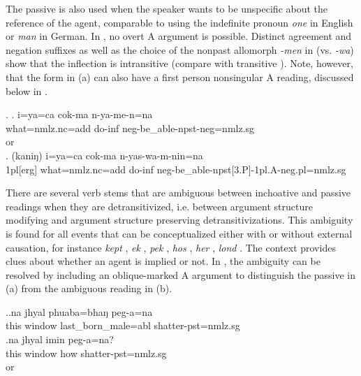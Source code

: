 The passive is also used when the speaker wants to be unspecific about the reference of the agent, comparable to using the indefinite pronoun \emph{one} in English or \emph{man} in German. In  \Next[a], no overt A argument is possible. Distinct agreement and negation suffixes as well as the choice of the nonpast allomorph \emph{-men} in \Next[a] (vs.  \emph{-wa}) show that the inflection is intransitive (compare with transitive \Next[b]). Note, however, that the form in (a) can also have a first person nonsingular A reading, discussed below in .

\ex. \ag. i=ya=ca cok-ma n-ya-me-n=na\\
what{\sc =nmlz.nc=add} do{\sc -inf} {\sc neg-}be\_able{\sc [3sg]-npst-neg=nmlz.sg}\\
 or\\
\bg. (kaniŋ) i=ya=ca cok-ma n-yas-wa-m-nin=na \\
{\sc 1pl[erg]} what{\sc =nmlz.nc=add} do{\sc -inf} {\sc neg-}be\_able{\sc -npst[3.P]-1pl.A-neg.pl=nmlz.sg}\\ 


There are several verb stems that are ambiguous between inchoative and passive readings when they are detransitivized, i.e. between argument structure modifying and argument structure preserving detransitivizations. This ambiguity is found for all events that can be conceptualized either with or without external causation, for instance \emph{kept} , \emph{ek} ,  \emph{pek} , \emph{hos} , \emph{her} , \emph{lond} . The context provides clues about whether an agent is implied or not. In \Next, the ambiguity can be resolved by including an oblique-marked A argument to distinguish the passive in (a) from the ambiguous reading in (b). 

\ex.\ag.na jhyal phuaba=bhaŋ peg-a=na\\
this window  last\_born\_male{\sc =abl}  shatter{\sc [3sg]-pst=nmlz.sg}\\
\bg.na jhyal imin peg-a=na?\\
this window how shatter{\sc [3sg]-pst=nmlz.sg}\\
 or \\

